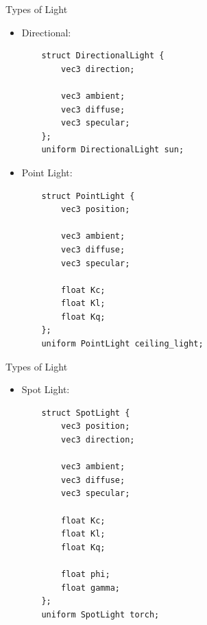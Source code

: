 \documentclass{beamer}
\begin{document}
\begin{frame}[fragile]{Types of Light}
    \begin{itemize}
        \item Directional:
              \footnotesize{
                  \begin{verbatim}
    struct DirectionalLight {
        vec3 direction;

        vec3 ambient;
        vec3 diffuse;
        vec3 specular;
    };
    uniform DirectionalLight sun;
\end{verbatim}
              }
        \item Point Light:
              \footnotesize{
                  \begin{verbatim}
    struct PointLight {
        vec3 position;

        vec3 ambient;
        vec3 diffuse;
        vec3 specular;

        float Kc;
        float Kl;
        float Kq;
    };
    uniform PointLight ceiling_light;
\end{verbatim}
              }
    \end{itemize}
\end{frame}

\begin{frame}[fragile]{Types of Light}
    \begin{itemize}
        \item Spot Light:
              \footnotesize{
                  \begin{verbatim}
    struct SpotLight {
        vec3 position;
        vec3 direction;

        vec3 ambient;
        vec3 diffuse;
        vec3 specular;

        float Kc;
        float Kl;
        float Kq;

        float phi;
        float gamma;
    };
    uniform SpotLight torch;
\end{verbatim}
              }
    \end{itemize}
\end{frame}
\end{document}
